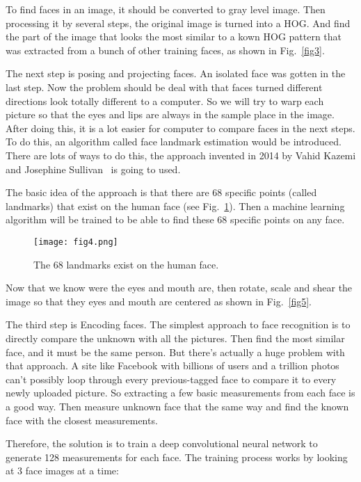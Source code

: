 \documentclass[10pt,twocolumn,letterpaper]{article}
\begin{document}
	\par
	To find faces in an image, it should be converted to gray level image. Then processing it by several steps, the original image is turned into a HOG. And find the part of the image that looks the most similar to a kown HOG pattern that was extracted from a bunch of other training faces, as shown in Fig.~\ref{fig3}.
	\par
	The next step is posing and projecting faces. An isolated face was gotten in the last step. Now the problem should be deal with that faces turned different directions look totally different to a computer. So we will try to warp each picture so that the eyes and lips are always in the sample place in the image. After doing this, it is a lot easier for computer to compare faces in the next steps. To do this, an algorithm called face landmark estimation would be introduced. There are lots of ways to do this, the approach invented in 2014 by Vahid Kazemi and Josephine Sullivan~\cite{Kazemi2014One} is going to used.
	\par
	The basic idea of the approach is that there are 68 specific points (called landmarks) that exist on the human face (see Fig.~\ref{fig4}). Then a machine learning algorithm will be trained to be able to find these 68 specific points on any face.
	\begin{figure}[h]
		\centering
		\texttt{[image: fig4.png]}
		\caption{The 68 landmarks exist on the human face.}\label{fig4}
	\end{figure}
	\par
	Now that we know were the eyes and mouth are, then rotate, scale and shear the image so that they eyes and mouth are centered as shown in Fig.~\ref{fig5}.
	\par
	The third step is Encoding faces. The simplest approach to face recognition is to directly compare the unknown with all the pictures. Then find the most similar face, and it must be the same person. But there's actually a huge problem with that approach. A site like Facebook with billions of users and a trillion photos can't possibly loop through every previous-tagged face to compare it to every newly uploaded picture. So extracting a few basic measurements from each face is a good way. Then measure unknown face that the same way and find the known face with the closest measurements.
	\par
	Therefore, the solution is to train a deep convolutional neural network to generate 128 measurements for each face. The training process works by looking at 3 face images at a time:
\end{document}
